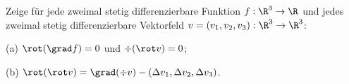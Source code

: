 \begin{prob} 
Zeige f\"ur jede zweimal stetig differenzierbare Funktion
$f:\R^3\to\R$ und jedes zweimal stetig differenzierbare Vektorfeld
$v=(v_1,v_2,v_3):\R^3\to\R^3$: 

(a) $\rot(\grad f)=0$ und $\div(\rot v)=0$;

(b) $\rot(\rot v) = \grad(\div v) - (\Delta v_1,\Delta v_2,\Delta
v_3)$. 
\end{prob}
